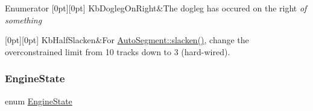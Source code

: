 \begin{DoxyEnumFields}{Enumerator}
[0pt][0pt]{}\mbox{\label{namespaceKatabatic_a2af2ad6b6441614038caf59d04b3b217afe7fcb4c332f36e477433169b3d3f515}} 
Kb\+Dogleg\+On\+Right&The dogleg has occured on the right {\itshape of something} \\
\hline

[0pt][0pt]{}\mbox{\label{namespaceKatabatic_a2af2ad6b6441614038caf59d04b3b217a1d6ccf82d04758a0922270d4f469066a}} 
Kb\+Half\+Slacken&For \hyperlink{classKatabatic_1_1AutoSegment_a1fbc0adb4c0b14632edc7c55f028cd4b}{Auto\+Segment\+::slacken()}, change the overconstrained limit from 10 tracks down to 3 (hard-\/wired). \\
\hline

\end{DoxyEnumFields}
\mbox{\label{namespaceKatabatic_ab9e409db5feff0bdbc85e90e2a029cda}} 
\subsubsection{\texorpdfstring{Engine\+State}{EngineState}}
{\footnotesize\ttfamily enum \hyperlink{namespaceKatabatic_ab9e409db5feff0bdbc85e90e2a029cda}{Engine\+State}}

